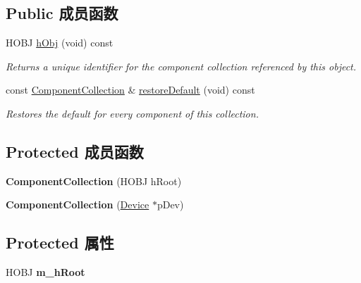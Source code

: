 \subsection*{Public 成员函数}
\begin{DoxyCompactItemize}
\item 
H\+O\+B\+J \hyperlink{classmv_i_m_p_a_c_t_1_1acquire_1_1_component_collection_a7073a97a1f05bb3cf45a15358b1ca557}{h\+Obj} (void) const 
\begin{DoxyCompactList}\small\item\em Returns a unique identifier for the component collection referenced by this object. \end{DoxyCompactList}\item 
const \hyperlink{classmv_i_m_p_a_c_t_1_1acquire_1_1_component_collection}{Component\+Collection} \& \hyperlink{classmv_i_m_p_a_c_t_1_1acquire_1_1_component_collection_a986cf6758394195fb4f47e8b5b9d0c8a}{restore\+Default} (void) const 
\begin{DoxyCompactList}\small\item\em Restores the default for every component of this collection. \end{DoxyCompactList}\end{DoxyCompactItemize}
\subsection*{Protected 成员函数}
\begin{DoxyCompactItemize}
\item 
\hypertarget{classmv_i_m_p_a_c_t_1_1acquire_1_1_component_collection_ae65cba200e6585531b0de331ad8fbc2e}{{\bfseries Component\+Collection} (H\+O\+B\+J h\+Root)}\label{classmv_i_m_p_a_c_t_1_1acquire_1_1_component_collection_ae65cba200e6585531b0de331ad8fbc2e}

\item 
\hypertarget{classmv_i_m_p_a_c_t_1_1acquire_1_1_component_collection_af6579e4e8e49b2d7560a259a81de266e}{{\bfseries Component\+Collection} (\hyperlink{classmv_i_m_p_a_c_t_1_1acquire_1_1_device}{Device} $\ast$p\+Dev)}\label{classmv_i_m_p_a_c_t_1_1acquire_1_1_component_collection_af6579e4e8e49b2d7560a259a81de266e}

\end{DoxyCompactItemize}
\subsection*{Protected 属性}
\begin{DoxyCompactItemize}
\item 
\hypertarget{classmv_i_m_p_a_c_t_1_1acquire_1_1_component_collection_a429f84c6b8e03c9c26c36de0d16021d2}{H\+O\+B\+J {\bfseries m\+\_\+h\+Root}}\label{classmv_i_m_p_a_c_t_1_1acquire_1_1_component_collection_a429f84c6b8e03c9c26c36de0d16021d2}

\end{DoxyCompactItemize}


